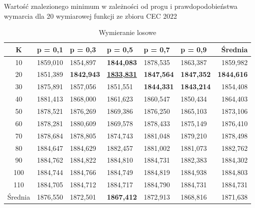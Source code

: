 \documentclass[10pt]{article}
\begin{document}
\begin{table}[H]
\caption{Wartość znalezionego minimum w zależności od progu i prawdopodobieństwa wymarcia dla 20 wymiarowej funkcji ze zbioru CEC 2022}
\label{tab:test-extinction-cec20}
\begin{subtable}{\textwidth}
\centering
\begin{tabularx}{0.8\textwidth}{c||X|X|X|X|X||r}
\hline
K & p = 0,1 & p = 0,3 & p = 0,5 & p = 0,7 & p = 0,9 & Średnia  \\ 
\hline \hline
10 & 1859,010 & 1854,897 & \textbf{1844,083} & 1878,535 & 1863,387 & 1859,982  \\ 
20 & 1851,389 & \textbf{1842,943} & \underline{\textbf{1833,831}} & \textbf{1847,564} & \textbf{1847,352} & \textbf{1844,616}  \\ 
30 & 1875,891 & 1857,056 & 1851,551 & \textbf{1844,331} & \textbf{1843,214} & 1854,408  \\ 
40 & 1881,413 & 1868,000 & 1861,623 & 1860,547 & 1850,434 & 1864,403  \\ 
50 & 1878,521 & 1876,269 & 1869,386 & 1876,250 & 1865,103 & 1873,106  \\ 
60 & 1878,281 & 1880,609 & 1869,578 & 1878,433 & 1875,149 & 1876,410  \\ 
70 & 1878,684 & 1878,805 & 1874,743 & 1881,048 & 1879,210 & 1878,498  \\ 
80 & 1884,647 & 1884,629 & 1882,457 & 1881,002 & 1881,073 & 1882,762  \\ 
90 & 1884,762 & 1884,822 & 1884,810 & 1884,731 & 1882,383 & 1884,302  \\ 
100 & 1884,744 & 1884,766 & 1884,749 & 1884,819 & 1884,938 & 1884,803  \\ 
110 & 1884,705 & 1884,712 & 1884,717 & 1884,790 & 1884,731 & 1884,731  \\ 
\hline
Średnia & 1876,550 & 1872,501 & \textbf{1867,412} & 1872,913 & 1868,816 & 1871,638  \\ 
\hline
\end{tabularx}
\caption{Wymieranie losowe}
\end{subtable}


\end{table}
\end{document}
